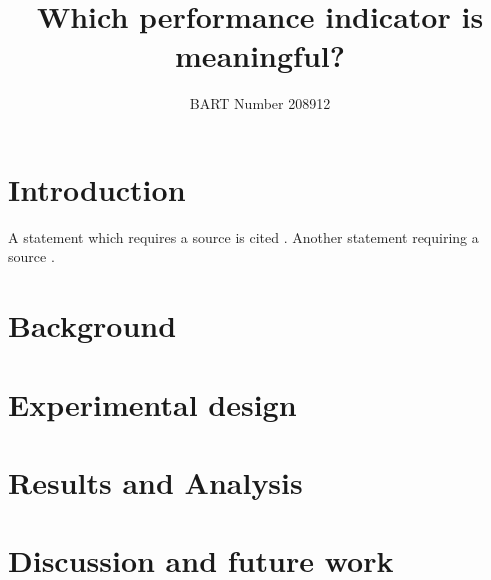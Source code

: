 \documentclass[sigconf,review,nonacm]{acmart}
\begin{document}
\title[Short title]{Which performance indicator is meaningful?}
\author{BART Number 208912}

\begin{abstract}
  \blindtext
\end{abstract}

\maketitle

\section{Introduction}
\blindtext\blindtext\blindtext

A statement which requires a source is cited \cite{giants}. Another statement requiring a source \cite{muskinterview}.

\balance

\section{Background}
\Blindtext

\Blindtext

\section{Experimental design}
\Blindtext

\blindtext

\section{Results and Analysis}
\Blindtext

\Blindtext

\section{Discussion and future work}
\Blindtext



 
\end{document}
